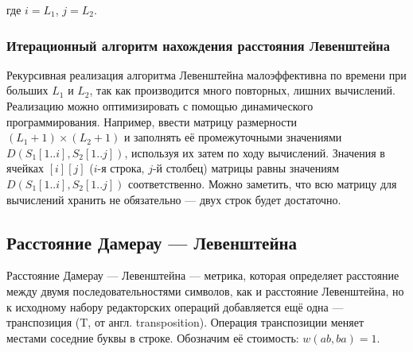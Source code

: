 где $i = L_1$, $j = L_2$.

\subsubsection{Итерационный алгоритм нахождения расстояния Левенштейна}

Рекурсивная реализация алгоритма Левенштейна малоэффективна по времени при больших $L_1$ и $L_2$, так как производится много повторных, лишних вычислений.
Реализацию можно оптимизировать с помощью динамического программирования.
Например, ввести матрицу размерности $(L_1 + 1) \times (L_2 + 1)$ и заполнять её промежуточными значениями $D(S_1[1 .. i], S_2[1 .. j])$, используя их затем по ходу вычислений.
Значения в ячейках $[i][j]$ ($i$-я строка, $j$-й столбец) матрицы равны значениям $D(S_1[1 .. i], S_2[1 .. j])$ соответственно.
Можно заметить, что всю матрицу для вычислений хранить не обязательно --- двух строк будет достаточно.

\subsection{Расстояние Дамерау --- Левенштейна}

Расстояние Дамерау --- Левенштейна --- метрика, которая определяет расстояние между двумя последовательностями символов, как и расстояние Левенштейна, но к исходному набору редакторских операций добавляется ещё одна --- транспозиция (T, от англ. transposition).
Операция транспозиции меняет местами соседние буквы в строке.
Обозначим её стоимость: $w(ab, ba) = 1$.

